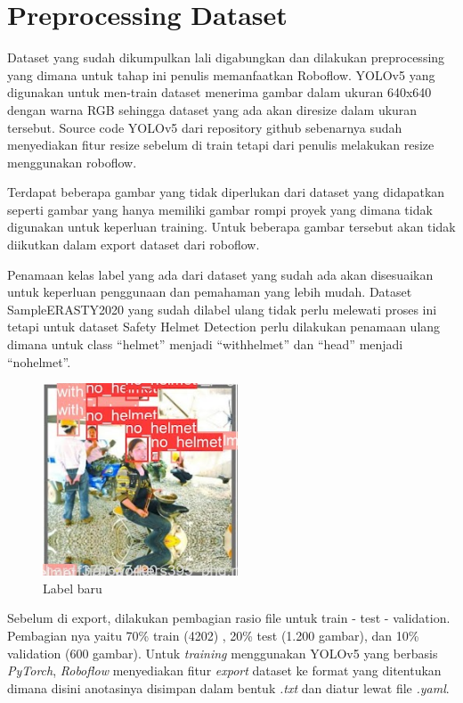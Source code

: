 \section{Preprocessing Dataset}
\label{sec:preprocessing}
Dataset yang sudah dikumpulkan lali digabungkan dan dilakukan preprocessing yang dimana untuk tahap ini penulis memanfaatkan Roboflow.
YOLOv5 yang digunakan untuk men-train dataset menerima gambar dalam ukuran 640x640 dengan warna RGB sehingga dataset yang ada akan diresize dalam ukuran tersebut. Source code YOLOv5 dari repository github sebenarnya sudah menyediakan fitur resize sebelum di train tetapi dari penulis melakukan resize menggunakan roboflow. 

Terdapat beberapa gambar yang tidak diperlukan dari dataset yang didapatkan seperti gambar yang hanya memiliki gambar rompi proyek yang dimana tidak digunakan untuk keperluan training. Untuk beberapa gambar tersebut akan tidak diikutkan dalam export dataset dari roboflow.

Penamaan kelas  label yang ada dari dataset yang sudah ada akan disesuaikan untuk keperluan penggunaan dan pemahaman yang lebih mudah. Dataset SampleERASTY2020 yang sudah dilabel ulang tidak perlu melewati proses ini tetapi untuk dataset Safety Helmet Detection perlu dilakukan penamaan ulang dimana untuk class “helmet” menjadi “with\textunderscore helmet” dan “head” menjadi “no\textunderscore helmet”.

\begin{figure}[ht]
  \centering
  \includegraphics[scale=1]{gambar/Screenshot_86.png}
  \caption{Label baru}
  \label{fig:labelbaru}  
\end{figure}

Sebelum di export, dilakukan pembagian rasio file untuk train - test - validation. Pembagian nya yaitu 70\% train (4202) , 20\% test (1.200 gambar), dan 10\% validation (600 gambar). Untuk \emph{training} menggunakan YOLOv5 yang berbasis \emph{PyTorch}, \emph{Roboflow} menyediakan fitur \emph{export} dataset ke format yang ditentukan dimana disini anotasinya disimpan dalam bentuk \emph{.txt} dan diatur lewat file \emph{.yaml}.

